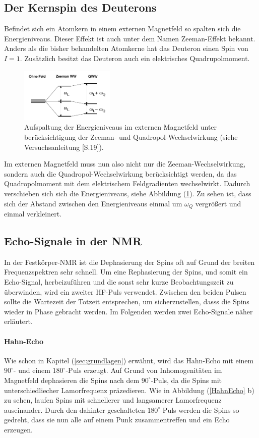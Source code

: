 \subsection{Der Kernspin des Deuterons}
Befindet sich ein Atomkern in einem externen Magnetfeld so spalten sich die Energie{\-}ni{\-}veaus.
Dieser Effekt ist auch unter dem Namen Zeeman-Effekt bekannt.
Anders als die bisher behandelten Atomkerne hat das Deuteron einen Spin von $I = 1$.
Zus\"{a}tzlich besitzt das Deuteron auch ein elektrisches Quadrupolmoment.
\begin{figure}[hbtp]
	\centering
	\includegraphics[width=0.4\textwidth]{Plots/aufspaltung.png}
	\caption{Aufspaltung der Energieniveaus im externen Magnetfeld unter ber\"{u}cksichtigung der Zeeman- und Quadropol-Wechselwirkung (siehe Versuchsanleitung \cite{Anleitung}[S.19]).}
	\label{QWW}
\end{figure}
Im externen Magnetfeld muss nun also nicht nur die Zeeman-Wechselwirkung, sondern auch die Quadropol-Wechselwirkung ber\"{u}cksichtigt werden, da das Quadropolmoment mit dem elektrischem Feldgradienten wechselwirkt.
Dadurch verschieben sich sich die Energieniveaus, siehe Abbildung (\ref{QWW}).
Zu sehen ist, dass sich der Abstand zwischen den Energieniveaus einmal um $\omega_Q$ vergr\"{o}{\ss}ert und einmal verkleinert.

\subsection{Echo-Signale in der NMR}
In der Festk\"{o}rper-NMR ist die Dephasierung der Spins oft auf Grund der breiten Frequenzspektren sehr schnell.
Um eine Rephasierung der Spins, und somit ein Echo-Signal, herbeizuf\"{u}hren und die sonst sehr kurze Beobachtungszeit zu \"{u}berwinden, wird ein zweiter HF-Puls verwendet.
Zwischen den beiden Pulsen sollte die Wartezeit der Totzeit entsprechen, um sicherzustellen, dasss die Spins wieder in Phase gebracht werden.
Im Folgenden werden zwei %
Echo-Signale n\"{a}her erl\"{a}utert.

\paragraph{Hahn-Echo}
Wie schon in Kapitel (\ref{sec:grundlagen}) erw\"{a}hnt, wird das Hahn-Echo mit einem $90^{\circ}$- und einem $180^{\circ}$-Puls erzeugt.
Auf Grund von Inhomogenit\"{a}ten im Magnetfeld dephasieren die Spins nach dem $90^{\circ}$-Puls, da die Spins mit unterschiedliecher Lamorfrequenz pr\"{a}zedieren.
Wie in Abbildung (\ref{HahnEcho} b) zu sehen, laufen Spins mit schnellerer und langsamerer Lamor{\-}fre{\-}quenz auseinander.
Durch den dahinter geschalteten $180^{\circ}$-Puls werden die Spins so gedreht, dass sie nun alle auf einem Punk zusammentreffen und ein Echo erzeugen.

